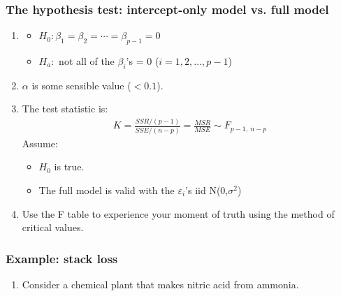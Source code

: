 \documentclass[handout]{beamer}\usepackage[]{graphicx}\usepackage[]{color}
\providecommand{\e}{\varepsilon}
\numberwithin{equation}{section}
\begin{document}
\begin{frame}
\frametitle{The hypothesis test: intercept-only model vs. full model}
\begin{enumerate}[1. ]
\item 
\begin{itemize}
\item $H_0: \beta_1 = \beta_2 = \cdots = \beta_{p-1} = 0$
\pause \item $H_a: $ not all of the $\beta_i$'s = 0 ($i = 1, 2, \ldots, p-1$)
\end{itemize}
\pause \item $\alpha$ is some sensible value ($< 0.1$).
\pause \item The test statistic is:
\pause \begin{align*}
K = \frac{SSR/(p-1)}{SSE/(n-p)} = \frac{MSR}{MSE}  \sim F_{p - 1, \ n - p}
\end{align*}
\pause Assume:
\begin{itemize}
\pause \item $H_0$ is true.
\pause \item The full model is valid with the $\e_i$'s iid N(0,$\sigma^2$)
\end{itemize}
\pause \item Use the F table to experience your moment of truth using the method of critical values.
\end{enumerate}
\end{frame}


\begin{frame}
\frametitle{Example: stack loss}
\begin{enumerate}[1. ]
\item Consider a chemical plant that makes nitric acid from ammonia.
\begin{itemize}
\end{itemize}
\end{enumerate}
\end{frame}
\end{document}
